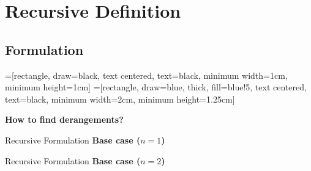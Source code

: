 \documentclass[9pt]{beamer}
\begin{document}
\section{Recursive Definition}
\subsection{Formulation}

=[rectangle, draw=black,
           text centered, text=black, minimum width=1cm, minimum height=1cm]
=[rectangle, draw=blue, thick, fill=blue!5,
           text centered, text=black, minimum width=2cm, minimum height=1.25cm]
\begin{frame}
\centering
\Huge \textbf{ How to find derangements? }
\end{frame}

\begin{frame} {Recursive Formulation}
    \Large {\textbf{Base case ($n = 1$)}} \\
    \vspace{1cm}
    \begin{figure}
        \centering
    \end{figure}
\end{frame}


\begin{frame} {Recursive Formulation}
    \Large {\textbf{Base case ($n = 2$)}} \\
    \vspace{1cm}
    \begin{figure}
        \centering
    \end{figure}
\end{frame}
\end{document}
